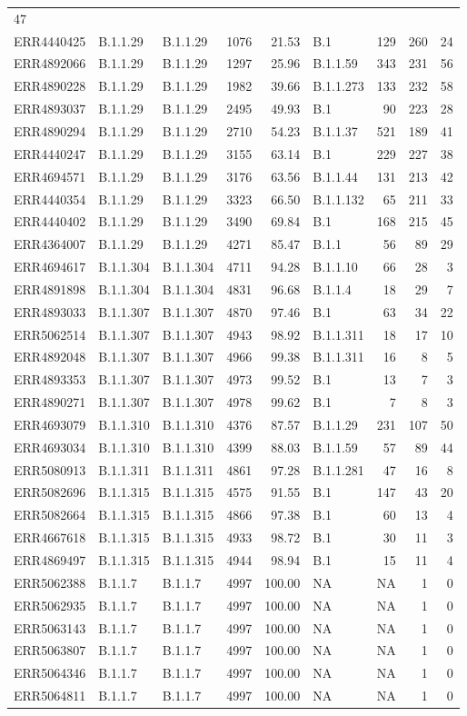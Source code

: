 \documentclass[
]{article}
\begin{document}
\begin{longtable}[]{@{}lllrrlrrr@{}}
47\tabularnewline
ERR4440425 & B.1.1.29 & B.1.1.29 & 1076 & 21.53 & B.1 & 129 & 260 &
24\tabularnewline
ERR4892066 & B.1.1.29 & B.1.1.29 & 1297 & 25.96 & B.1.1.59 & 343 & 231 &
56\tabularnewline
ERR4890228 & B.1.1.29 & B.1.1.29 & 1982 & 39.66 & B.1.1.273 & 133 & 232
& 58\tabularnewline
ERR4893037 & B.1.1.29 & B.1.1.29 & 2495 & 49.93 & B.1 & 90 & 223 &
28\tabularnewline
ERR4890294 & B.1.1.29 & B.1.1.29 & 2710 & 54.23 & B.1.1.37 & 521 & 189 &
41\tabularnewline
ERR4440247 & B.1.1.29 & B.1.1.29 & 3155 & 63.14 & B.1 & 229 & 227 &
38\tabularnewline
ERR4694571 & B.1.1.29 & B.1.1.29 & 3176 & 63.56 & B.1.1.44 & 131 & 213 &
42\tabularnewline
ERR4440354 & B.1.1.29 & B.1.1.29 & 3323 & 66.50 & B.1.1.132 & 65 & 211 &
33\tabularnewline
ERR4440402 & B.1.1.29 & B.1.1.29 & 3490 & 69.84 & B.1 & 168 & 215 &
45\tabularnewline
ERR4364007 & B.1.1.29 & B.1.1.29 & 4271 & 85.47 & B.1.1 & 56 & 89 &
29\tabularnewline
ERR4694617 & B.1.1.304 & B.1.1.304 & 4711 & 94.28 & B.1.1.10 & 66 & 28 &
3\tabularnewline
ERR4891898 & B.1.1.304 & B.1.1.304 & 4831 & 96.68 & B.1.1.4 & 18 & 29 &
7\tabularnewline
ERR4893033 & B.1.1.307 & B.1.1.307 & 4870 & 97.46 & B.1 & 63 & 34 &
22\tabularnewline
ERR5062514 & B.1.1.307 & B.1.1.307 & 4943 & 98.92 & B.1.1.311 & 18 & 17
& 10\tabularnewline
ERR4892048 & B.1.1.307 & B.1.1.307 & 4966 & 99.38 & B.1.1.311 & 16 & 8 &
5\tabularnewline
ERR4893353 & B.1.1.307 & B.1.1.307 & 4973 & 99.52 & B.1 & 13 & 7 &
3\tabularnewline
ERR4890271 & B.1.1.307 & B.1.1.307 & 4978 & 99.62 & B.1 & 7 & 8 &
3\tabularnewline
ERR4693079 & B.1.1.310 & B.1.1.310 & 4376 & 87.57 & B.1.1.29 & 231 & 107
& 50\tabularnewline
ERR4693034 & B.1.1.310 & B.1.1.310 & 4399 & 88.03 & B.1.1.59 & 57 & 89 &
44\tabularnewline
ERR5080913 & B.1.1.311 & B.1.1.311 & 4861 & 97.28 & B.1.1.281 & 47 & 16
& 8\tabularnewline
ERR5082696 & B.1.1.315 & B.1.1.315 & 4575 & 91.55 & B.1 & 147 & 43 &
20\tabularnewline
ERR5082664 & B.1.1.315 & B.1.1.315 & 4866 & 97.38 & B.1 & 60 & 13 &
4\tabularnewline
ERR4667618 & B.1.1.315 & B.1.1.315 & 4933 & 98.72 & B.1 & 30 & 11 &
3\tabularnewline
ERR4869497 & B.1.1.315 & B.1.1.315 & 4944 & 98.94 & B.1 & 15 & 11 &
4\tabularnewline
ERR5062388 & B.1.1.7 & B.1.1.7 & 4997 & 100.00 & NA & NA & 1 &
0\tabularnewline
ERR5062935 & B.1.1.7 & B.1.1.7 & 4997 & 100.00 & NA & NA & 1 &
0\tabularnewline
ERR5063143 & B.1.1.7 & B.1.1.7 & 4997 & 100.00 & NA & NA & 1 &
0\tabularnewline
ERR5063807 & B.1.1.7 & B.1.1.7 & 4997 & 100.00 & NA & NA & 1 &
0\tabularnewline
ERR5064346 & B.1.1.7 & B.1.1.7 & 4997 & 100.00 & NA & NA & 1 &
0\tabularnewline
ERR5064811 & B.1.1.7 & B.1.1.7 & 4997 & 100.00 & NA & NA & 1 &
0\tabularnewline

\end{longtable}
\end{document}
